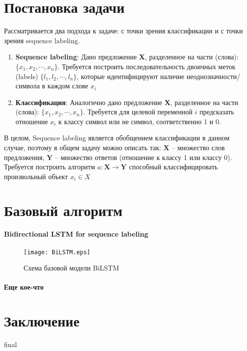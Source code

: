 \documentclass[12pt,twoside]{article}
\begin{document}
\section{Постановка задачи}
Рассматривается два подхода к задаче: с точки зрения классификации и с точки зрения sequence labeling.

\begin{enumerate}
	\item \textbf{Sequence labeling}: Дано предложение \textbf{X}, разделенное на части (слова): $\{x_1, x_2, \cdots, x_n\}$. Требуется построить последовательность двоичных меток (labels) $\{l_1, l_2, \cdots, l_n\}$, которые идентифицируют наличие неоднозначности/символа в каждом слове  $x_i$
	
	\item \textbf{Классификация}: Аналогично дано предложение \textbf{X}, разделенное на части (слова): $\{x_1, x_2, \cdots, x_n\}$. Требуется для целевой переменной $i$ предсказать отношение $x_i$ к классу символ или не символ, соответственно 1 и 0. 
\end{enumerate}

В целом, Sequence labeling является обобщением классификации в данном случае, поэтому в общем задачу можно описать так:
$\textbf{X}$ -- множество слов предложения, $\textbf{Y}$ -- множество ответов (отношение к классу 1 или классу 0). Требуется построить алгоритм $a: \textbf{X} \rightarrow \textbf{Y}$ способный классифицировать произвольный объект $x_i \in X$

\section{Базовый алгоритм}

\paragraph{Bidirectional LSTM for sequence labeling}
\begin{figure}[H]
	\centering
	\texttt{[image: BiLSTM.eps]}
	\caption{Схема базовой модели BiLSTM}
\end{figure}


\paragraph{Еще кое-что} 


\section{Заключение}
final
\end{document}
